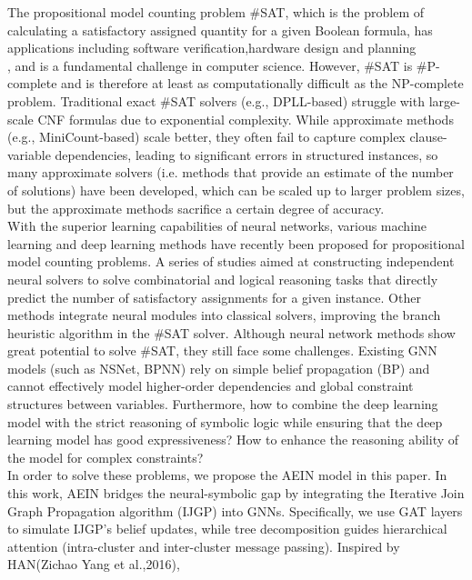 The propositional model counting problem \#SAT, which is the problem of calculating a satisfactory assigned quantity for a given Boolean formula, 
has applications including software verification\cite{A1}\cite{A2},hardware design and planning\cite{B1}\cite{B2}\\ \cite{A3}, and is a fundamental 
challenge in computer science. However, \#SAT is \#P-complete and is therefore at least as computationally difficult as the NP-complete problem. 
Traditional exact \#SAT solvers (e.g., DPLL-based)\cite{A4}\cite{A5} struggle with large-scale CNF formulas due to exponential complexity. 
While approximate methods (e.g., MiniCount-based)\cite{A6} scale better, they often fail to capture complex clause-variable dependencies, leading 
to significant errors in structured instances, so many approximate solvers (i.e. methods that provide an estimate of the number of solutions) have 
been developed, which can be scaled up to larger problem sizes, but the approximate methods sacrifice a certain degree of accuracy.\\
With the superior learning capabilities of neural networks, various machine learning and deep learning methods have recently been proposed for 
propositional model counting problems\cite{A7}\cite{B3}\cite{B4}. A series of studies aimed at constructing independent neural solvers to solve 
combinatorial and logical reasoning tasks that directly predict the number of satisfactory assignments for a given instance\cite{A8}\cite{A9}. 
Other methods integrate neural modules into classical solvers, improving the branch heuristic algorithm in the \#SAT solver\cite{A10}. Although 
neural network methods show great potential to solve \#SAT, they still face some challenges. Existing GNN models (such as NSNet\cite{A11}, 
BPNN\cite{A12}) rely on simple belief propagation (BP) and cannot effectively model higher-order dependencies and global constraint structures 
between variables. Furthermore, how to combine the deep learning model with the strict reasoning of symbolic logic while ensuring that the deep 
learning model has good expressiveness?\cite{A12} How to enhance the reasoning ability of the model for complex constraints?\cite{A14}\\
In order to solve these problems, we propose the AEIN model in this paper. In this work, AEIN bridges the neural-symbolic gap by integrating the 
Iterative Join Graph Propagation  algorithm (IJGP)\cite{A15} into GNNs.   Specifically, we use GAT layers to simulate IJGP's belief updates, while 
tree decomposition guides hierarchical attention (intra-cluster and inter-cluster message passing). Inspired by HAN(Zichao Yang et al.,2016)\cite{B5}, 
